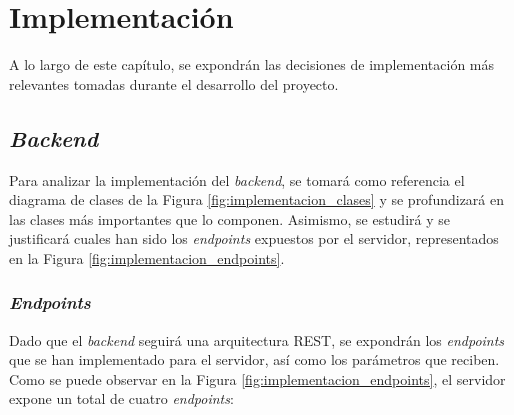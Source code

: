 \chapter{Implementación}
\label{chap:implementacion}

A lo largo de este capítulo, se expondrán las decisiones de implementación más relevantes tomadas durante el desarrollo del proyecto.

\section{\textit{Backend}}

Para analizar la implementación del \textit{backend}, se tomará como referencia el diagrama de clases de la Figura \ref{fig:implementacion_clases} y se profundizará
en las clases más importantes que lo componen. Asimismo, se estudirá y se justificará cuales han sido los \textit{endpoints} expuestos por el servidor,
representados en la Figura \ref{fig:implementacion_endpoints}.

\subsection{\textit{Endpoints}}

Dado que el \textit{backend} seguirá una arquitectura REST, se expondrán los \textit{endpoints} que se han implementado para el servidor, así como los parámetros
que reciben. Como se puede observar en la Figura \ref{fig:implementacion_endpoints}, el servidor expone un total de cuatro \textit{endpoints}:

